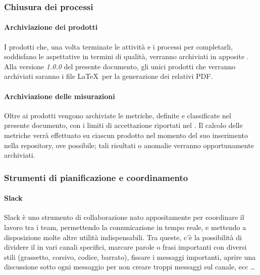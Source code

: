 
		\subsubsection{Chiusura dei processi}

    		\paragraph{Archiviazione dei prodotti}
			I prodotti che, una volta terminate le attività e i processi per completarli, soddisfano le aspettative in termini di qualità,
			verranno archiviati in apposite . Alla versione \textit{1.0.0} del presente documento, gli unici prodotti che verranno
			archiviati saranno i file \LaTeX\ per la generazione dei relativi PDF.

    		\paragraph{Archiviazione delle misurazioni}
			Oltre ai prodotti vengono archiviate le metriche, definite e classificate nel presente documento, con i limiti di accettazione riportati nel \Doc{\PdQv}.
			Il calcolo delle metriche verrà effettuato su ciascun prodotto nel momento del suo inserimento nella repository, ove possibile; tali risultati o
			anomalie verranno opportunamente archiviati. %

    	\subsubsection{Strumenti di pianificazione e coordinamento}\label{pianificazione e coordinamento}

    		\paragraph{Slack}
			Slack è uno strumento di collaborazione nato appositamente per coordinare il lavoro tra i team, permettendo la comunicazione in tempo
			reale, e mettendo a disposizione molte altre utilità indispensabili. Tra queste, c'è la possibilità di dividere il  in vari canali
			specifici, marcare parole o frasi importanti con diversi stili (grassetto, corsivo, codice, barrato), fissare i messaggi importanti, aprire una discussione
			sotto ogni messaggio per non creare troppi messaggi sul canale, ecc \dots

